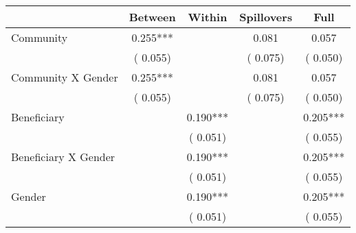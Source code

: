 
\begin{tabular}{l*{4}{c}}\hline&\multicolumn{1}{c}{Between}&\multicolumn{1}{c}{Within}&\multicolumn{1}{c}{Spillovers}&\multicolumn{1}{c}{Full}\\ \hline
 Community                                     &              0.255***      &                                               &        0.081 &         0.057                            \\ 
                                                       &        (       0.055)           &                                       &       (       0.075)     &      (       0.050)                                           \\ 
 Community X Gender            &              0.255***      &                                               &        0.081 &         0.057                            \\ 
                                                       &        (       0.055)           &                                       &       (       0.075)     &      (       0.050)                                           \\ 
 Beneficiary                           &                                               &        0.190***    &                                &             0.205***                            \\ 
                                                       &                                               & (       0.051)                  &                                        &      (       0.055)                                           \\ 
 Beneficiary X Gender          &                                               &        0.190***    &                                &             0.205***                            \\ 
                                                       &                                               & (       0.051)                  &                                        &      (       0.055)                                           \\ 
 Gender                                        &                              &        0.190***    &                                &             0.205***                            \\ 
                                                       &                                               & (       0.051)                  &                                        &      (       0.055)                                           \\ 

\end{tabular}
